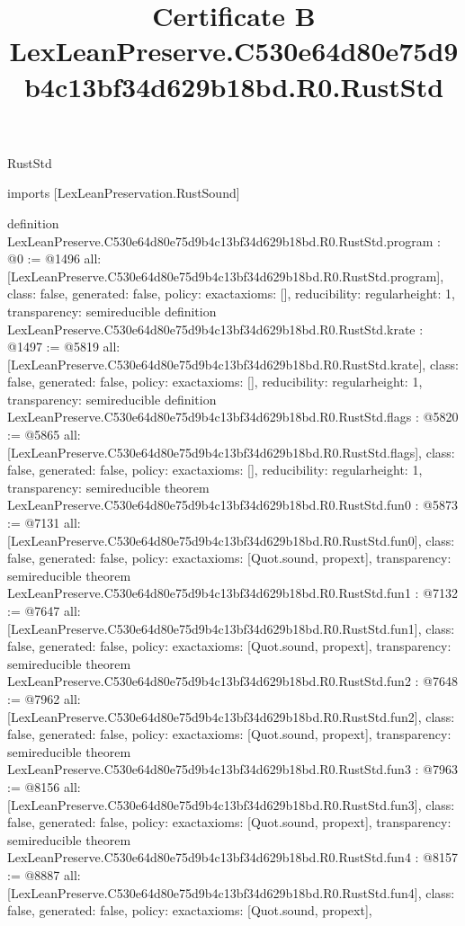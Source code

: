 \begin{lexlean}{RustStd}
\title{Certificate B LexLeanPreserve.C530e64d80e75d9b4c13bf34d629b18bd.R0.RustStd}
\begin{coremodule}
imports [LexLeanPreservation.RustSound]

definition LexLeanPreserve.C530e64d80e75d9b4c13bf34d629b18bd.R0.RustStd.program : @0 := @1496 {
  all: [LexLeanPreserve.C530e64d80e75d9b4c13bf34d629b18bd.R0.RustStd.program],
  class: false,
  generated: false,
  policy: exact{axioms: []},
  reducibility: regular{height: 1},
  transparency: semireducible
}
definition LexLeanPreserve.C530e64d80e75d9b4c13bf34d629b18bd.R0.RustStd.krate : @1497 := @5819 {
  all: [LexLeanPreserve.C530e64d80e75d9b4c13bf34d629b18bd.R0.RustStd.krate],
  class: false,
  generated: false,
  policy: exact{axioms: []},
  reducibility: regular{height: 1},
  transparency: semireducible
}
definition LexLeanPreserve.C530e64d80e75d9b4c13bf34d629b18bd.R0.RustStd.flags : @5820 := @5865 {
  all: [LexLeanPreserve.C530e64d80e75d9b4c13bf34d629b18bd.R0.RustStd.flags],
  class: false,
  generated: false,
  policy: exact{axioms: []},
  reducibility: regular{height: 1},
  transparency: semireducible
}
theorem LexLeanPreserve.C530e64d80e75d9b4c13bf34d629b18bd.R0.RustStd.fun0 : @5873 := @7131 {
  all: [LexLeanPreserve.C530e64d80e75d9b4c13bf34d629b18bd.R0.RustStd.fun0],
  class: false,
  generated: false,
  policy: exact{axioms: [Quot.sound, propext]},
  transparency: semireducible
}
theorem LexLeanPreserve.C530e64d80e75d9b4c13bf34d629b18bd.R0.RustStd.fun1 : @7132 := @7647 {
  all: [LexLeanPreserve.C530e64d80e75d9b4c13bf34d629b18bd.R0.RustStd.fun1],
  class: false,
  generated: false,
  policy: exact{axioms: [Quot.sound, propext]},
  transparency: semireducible
}
theorem LexLeanPreserve.C530e64d80e75d9b4c13bf34d629b18bd.R0.RustStd.fun2 : @7648 := @7962 {
  all: [LexLeanPreserve.C530e64d80e75d9b4c13bf34d629b18bd.R0.RustStd.fun2],
  class: false,
  generated: false,
  policy: exact{axioms: [Quot.sound, propext]},
  transparency: semireducible
}
theorem LexLeanPreserve.C530e64d80e75d9b4c13bf34d629b18bd.R0.RustStd.fun3 : @7963 := @8156 {
  all: [LexLeanPreserve.C530e64d80e75d9b4c13bf34d629b18bd.R0.RustStd.fun3],
  class: false,
  generated: false,
  policy: exact{axioms: [Quot.sound, propext]},
  transparency: semireducible
}
theorem LexLeanPreserve.C530e64d80e75d9b4c13bf34d629b18bd.R0.RustStd.fun4 : @8157 := @8887 {
  all: [LexLeanPreserve.C530e64d80e75d9b4c13bf34d629b18bd.R0.RustStd.fun4],
  class: false,
  generated: false,
  policy: exact{axioms: [Quot.sound, propext]},
}
\end{coremodule}
\end{lexlean}
